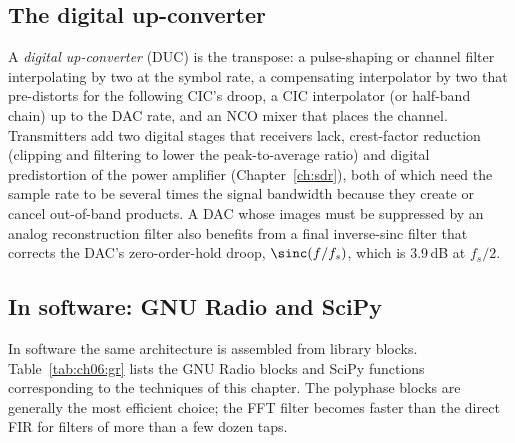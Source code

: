 \subsection{The digital up-converter}

A \emph{digital up-converter} (DUC) is the transpose: a pulse-shaping or channel filter interpolating
by two at the symbol rate, a compensating interpolator by two that pre-distorts for the following
CIC's droop, a CIC interpolator (or half-band chain) up to the DAC rate, and an NCO mixer that places the
channel. Transmitters add two digital stages that receivers lack, crest-factor reduction (clipping and
filtering to lower the peak-to-average ratio) and digital predistortion of the power amplifier
(Chapter~\ref{ch:sdr}), both of which need the sample rate to be several times the signal bandwidth
because they create or cancel out-of-band products. A DAC whose images must be suppressed by an
analog reconstruction filter also benefits from a final inverse-sinc filter that corrects the
DAC's zero-order-hold droop, $\sinc(f/f_s)$, which is 3.9\,dB at $f_s/2$.

\subsection{In software: GNU Radio and SciPy}

In software the same architecture is assembled from library blocks. Table~\ref{tab:ch06:gr} lists the
GNU Radio blocks and SciPy functions corresponding to the techniques of this chapter. The polyphase
blocks are generally the most efficient choice; the FFT filter becomes faster than the direct FIR
for filters of more than a few dozen taps.

